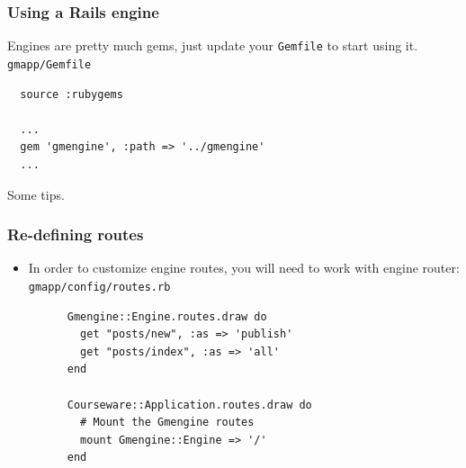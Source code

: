 \documentclass[compress]{beamer}
\begin{document}
\begin{frame}[fragile]
\frametitle{Using a Rails engine}
Engines are pretty much gems, just update your \texttt{Gemfile} to start using it.
\\
\small\texttt{gmapp/Gemfile}
\begin{verbatim}
  source :rubygems

  ...
  gem 'gmengine', :path => '../gmengine'
  ...
\end{verbatim}
\end{frame}

\begin{frame}
  \begin{center}
  \huge Some tips.
  \end{center}
\end{frame}

\begin{frame}[fragile]
\frametitle{Re-defining routes}
\begin{itemize}
  \item In order to customize engine routes, you will need to work with engine router:
    \\
    \texttt{gmapp/config/routes.rb}
    \begin{verbatim}
      Gmengine::Engine.routes.draw do
        get "posts/new", :as => 'publish'
        get "posts/index", :as => 'all'
      end

      Courseware::Application.routes.draw do
        # Mount the Gmengine routes
        mount Gmengine::Engine => '/'
      end
    \end{verbatim}
\end{itemize}
\end{frame}
\end{document}
